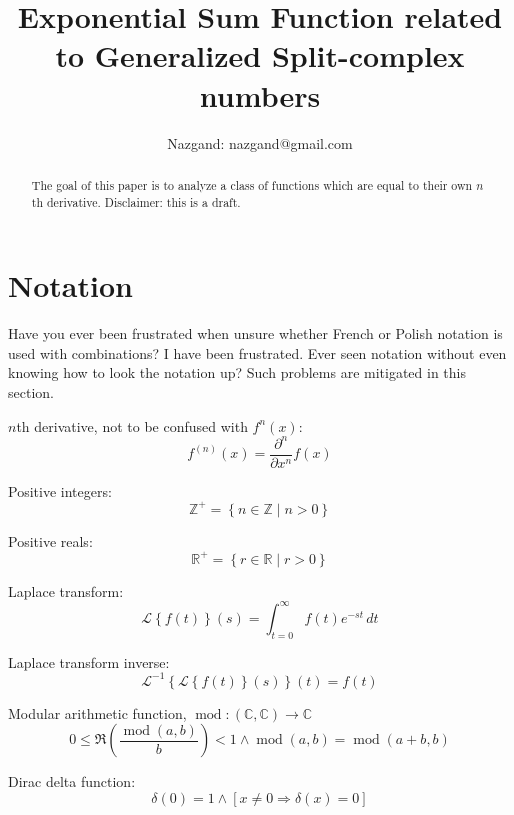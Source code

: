 \documentclass[]{article}
\title{Exponential Sum Function related to Generalized Split-complex numbers}
\author{Nazgand: nazgand@gmail.com}
\DeclareMathOperator{\md}{mod}
\newcommand{\pqty}[1]{{\left(#1\right)}}
\newcommand{\Bqty}[1]{{\left\{#1\right\}}}
\newcommand{\bqty}[1]{{\left[#1\right]}}
\newcommand{\laplace}[1]{\mathcal{L}\Bqty{#1}\pqty{s}}
\newcommand{\laplaceInv}[1]{\mathcal{L}^{-1}\Bqty{#1}\pqty{t}}
\newcommand{\pdiff}[2]{\frac{\partial^{#2}}{\partial #1^{#2}}}
\begin{document}
	
	\maketitle
	
	\begin{abstract}
		The goal of this paper is to analyze a class of functions which are equal to their own \(n\)th derivative. Disclaimer: this is a draft.
	\end{abstract}
	
	\section{Notation}
	Have you ever been frustrated when unsure whether French or Polish notation is used with combinations? I have been frustrated. Ever seen notation without even knowing how to look the notation up? Such problems are mitigated in this section.
	
	\(n\)th derivative, not to be confused with \(f^{n}\pqty{x}\):
	\begin{equation}
	f^{(n)}\pqty{x}
	=
	\pdiff{x}{n}f\pqty{x}
	\end{equation}
	
	Positive integers:
	\begin{equation}
	\mathbb{Z}^+=\left\{n\in\mathbb{Z}\mid n>0\right\}
	\end{equation}
	
	Positive reals:
	\begin{equation}
	\mathbb{R}^+=\left\{r\in\mathbb{R}\mid r>0\right\}
	\end{equation}
	
	Laplace transform:
	\begin{equation}
	\laplace{f\pqty{t}}=
	\int_{t=0}^{\infty}f\pqty{t}e^{-st}\,dt
	\end{equation}
	
	Laplace transform inverse:
	\begin{equation}
	\laplaceInv{\laplace{f\pqty{t}}}=f\pqty{t}
	\end{equation}
	
	Modular arithmetic function, $\md:\pqty{\mathbb{C},\mathbb{C}}\rightarrow\mathbb{C}$
	\begin{equation}
	0\leq\Re\pqty{\frac{\md\pqty{a,b}}{b}}<1
	\land
	\md\pqty{a,b}=\md\pqty{a+b,b}
	\end{equation}
	
	Dirac delta function:
	\begin{equation}
	\delta\pqty{0}=1
	\land
	\bqty{x\neq 0 \Rightarrow \delta\pqty{x}=0}
	\end{equation}
	
\end{document}
